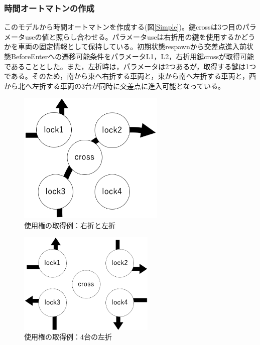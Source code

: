 \documentclass[twocolumn,10pt]{jsarticle}
\begin{document}
	\subsubsection{時間オートマトンの作成}
	このモデルから時間オートマトンを作成する(図\ref{Simple})。鍵crossは3つ目のパラメータuseの値と照らし合わせる。パラメータuseは右折用の鍵を使用するかどうかを車両の固定情報として保持している。初期状態respawnから交差点進入前状態BeforeEnterへの遷移可能条件をパラメータL1，L2，右折用鍵crossが取得可能であることとした。また，左折時は，パラメータは2つあるが，取得する鍵は1つである。そのため，南から東へ右折する車両と，東から南へ左折する車両と，西から北へ左折する車両の3台が同時に交差点に進入可能となっている。
	\begin{figure}[htbp]
	\centering
	\includegraphics[width=70mm]{wn-se.png}
	\caption{使用権の取得例：右折と左折}
	\label{RL}
	\end{figure}
	\begin{figure}[htbp]
	\centering
	\includegraphics[width=65mm]{leftcouse.png}
	\caption{使用権の取得例：4台の左折}
	\label{4L}
	\end{figure}
\end{document}
